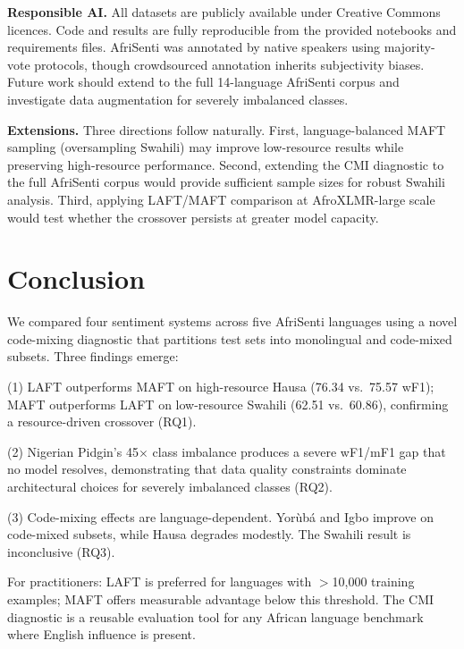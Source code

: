 \documentclass[11pt,twocolumn]{article}
\begin{document}
\textbf{Responsible AI.} All datasets are publicly available under Creative Commons
licences. Code and results are fully reproducible from the provided notebooks and
requirements files. AfriSenti was annotated by native speakers using majority-vote
protocols, though crowdsourced annotation inherits subjectivity biases. Future work should
extend to the full 14-language AfriSenti corpus and investigate data augmentation for
severely imbalanced classes.

\textbf{Extensions.} Three directions follow naturally. First, language-balanced MAFT
sampling (oversampling Swahili) may improve low-resource results while preserving
high-resource performance. Second, extending the CMI diagnostic to the full AfriSenti
corpus would provide sufficient sample sizes for robust Swahili analysis. Third, applying
LAFT/MAFT comparison at AfroXLMR-large scale would test whether the crossover persists at
greater model capacity.

\section{Conclusion}

We compared four sentiment systems across five AfriSenti languages using a novel
code-mixing diagnostic that partitions test sets into monolingual and code-mixed subsets.
Three findings emerge:

(1) LAFT outperforms MAFT on high-resource Hausa (76.34 vs.\ 75.57 wF1); MAFT outperforms
LAFT on low-resource Swahili (62.51 vs.\ 60.86), confirming a resource-driven crossover
(RQ1).

(2) Nigerian Pidgin's 45$\times$ class imbalance produces a severe wF1/mF1 gap that no
model resolves, demonstrating that data quality constraints dominate architectural choices
for severely imbalanced classes (RQ2).

(3) Code-mixing effects are language-dependent. Yor\`{u}b\'{a} and Igbo improve on
code-mixed subsets, while Hausa degrades modestly. The Swahili result is inconclusive
(RQ3).

For practitioners: LAFT is preferred for languages with $>$10,000 training examples; MAFT
offers measurable advantage below this threshold. The CMI diagnostic is a reusable
evaluation tool for any African language benchmark where English influence is present.



\end{document}
